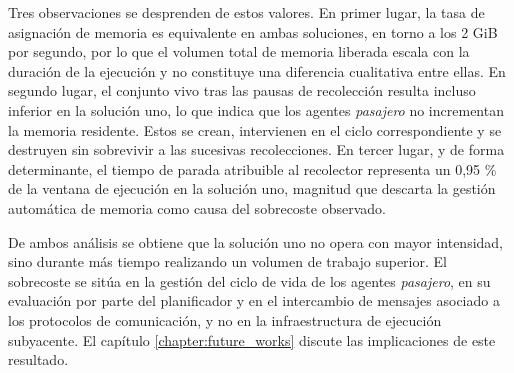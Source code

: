 Tres observaciones se desprenden de estos valores. En primer lugar, la tasa de asignación de
memoria es equivalente en ambas soluciones, en torno a los 2 GiB por segundo, por lo que el
volumen total de memoria liberada escala con la duración de la ejecución y no constituye una
diferencia cualitativa entre ellas. En segundo lugar, el conjunto vivo tras las pausas de
recolección resulta incluso inferior en la solución uno, lo que indica que los agentes
\textit{pasajero} no incrementan la memoria residente. Estos se crean, intervienen en el ciclo
correspondiente y se destruyen sin sobrevivir a las sucesivas recolecciones. En tercer lugar,
y de forma determinante, el tiempo de parada atribuible al recolector representa un
0,95 \% de la ventana de ejecución en la solución uno, magnitud que descarta la gestión
automática de memoria como causa del sobrecoste observado.

De ambos análisis se obtiene que la solución uno no opera con mayor
intensidad, sino durante más tiempo realizando un volumen de trabajo superior. El
sobrecoste se sitúa en la gestión del ciclo de vida de los agentes
\textit{pasajero}, en su evaluación por parte del planificador y en el intercambio de
mensajes asociado a los protocolos de comunicación, y no en la infraestructura de ejecución
subyacente. El capítulo \ref{chapter:future_works} discute las implicaciones de este
resultado.